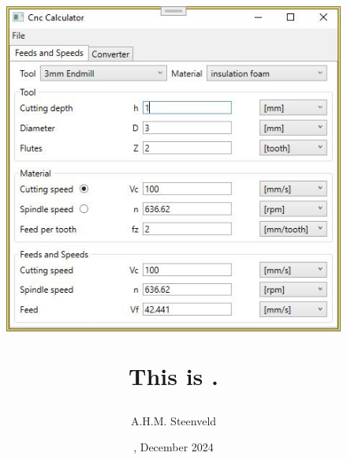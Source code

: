 \documentclass[10pt,a4paper,oneside]{book}
\author{A.H.M. Steenveld}
\title{
	\begin{figure}[h!]
		\centering
		\includegraphics[width=0.6\linewidth]{../CncCalculator_screenshot.jpg}
	\end{figure}
	This is \CC.
}
\date{\Version, December 2024}
\begin{document}
	\maketitle\frontmatter%
	
    \tableofcontents\mainmatter%
    
    
    
\begin{appendices}
	
\end{appendices}\backmatter%
\clearpage{}\printindex

%
\end{document}
